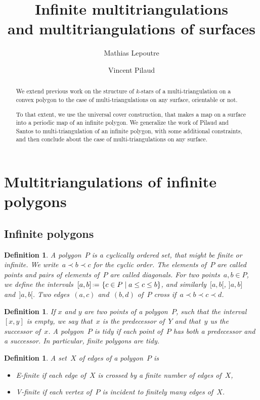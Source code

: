 \documentclass{amsart}
\title[Infinite multitriangulations and multitriangulations of surfaces]{Infinite multitriangulations \\ and multitriangulations of surfaces}
\author{Mathias Lepoutre}
\author{Vincent Pilaud}
\newtheorem{definition}[theorem]{Definition}
\theoremstyle{remark}
\newcommand{\darkblue}{\color{darkblue}} %
\newcommand{\defn}[1]{\textsl{\darkblue #1}} %
\newcommand*{\ef}[0]{E-finite\xspace}
\newcommand*{\vf}[0]{V-finite\xspace}
\newcommand{\cl}{\prec}
\newcommand{\set}[2]{\left\{ #1 \;\middle|\; #2 \right\}} %
\newcommand{\eqdef}{\mbox{\,\raisebox{0.2ex}{\scriptsize\ensuremath{\mathrm:}}\ensuremath{=}\,}} %
\begin{document}
\begin{abstract}
We extend previous work on the structure of $k$-stars of a multi-triangulation on a convex polygon to the case of multi-triangulations on any surface, orientable or not. 

To that extent, we use the universal cover construction, that makes a map on a surface into a periodic map of an infinite polygon. We generalize the work of Pilaud and Santos to multi-triangulation of an infinite polygon, with some additional constraints, and then conclude about the case of multi-triangulations on any surface.
\end{abstract}

\maketitle

\section{Multitriangulations of infinite polygons}

\subsection{Infinite polygons}

\begin{definition}
A \defn{polygon}~$P$ is a cyclically ordered set, that might be finite or infinite.
We write~$a \cl b \cl c$ for the cyclic order.
The elements of~$P$ are called \defn{points} and pairs of elements of~$P$ are called \defn{diagonals}.
For two points~$a,b \in P$, we define the intervals~$[a,b] \eqdef \set{c \in P}{a \le c \le b}$, and similarly~$[a,b[$, $]a,b]$ and~$]a,b[$.
Two edges~$(a,c)$ and~$(b,d)$ of~$P$ \defn{cross} if~$a \cl b \cl c \cl d$.
\end{definition}

\begin{definition}
If $x$ and $y$ are two points of a polygon~$P$, such that the interval~$[x,y]$ is empty, we say that~$x$ is the \defn{predecessor} of~$Y$ and that~$y$ us the \defn{successor} of~$x$. A polygon~$P$ is \defn{tidy} if each point of~$P$ has both a predecessor and a successor. In particular, finite polygons are tidy.
\end{definition}

\begin{definition}
A set~$X$ of edges of a polygon~$P$ is 
\begin{itemize}
\item \defn{\ef} if each edge of~$X$ is crossed by a finite number of edges of~$X$,
\item \defn{\vf} if each vertex of~$P$ is incident to finitely many edges of~$X$.
\end{itemize}
\end{definition}
\end{document}

